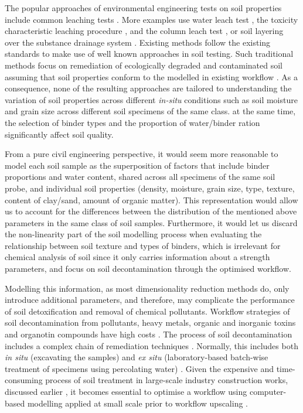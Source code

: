 \documentclass[algorithms,article,submit,pdftex,moreauthors]{Definitions/mdpi}
\begin{document}
The popular approaches of environmental engineering tests on soil properties include common leaching tests \cite{Chittoori,Beauchesne,Lemenkova202233}. More examples use water leach test \cite{Becker}, the toxicity characteristic leaching procedure \cite{Fuessle}, and the column leach test \cite{Dayioglu}, or soil layering over the substance drainage system \cite{Yu}. Existing methods follow the existing standards to make use of well known approaches in soil testing. Such traditional methods focus on remediation of ecologically degraded and contaminated soil assuming that soil properties conform to the modelled in existing workflow \cite{Alpaslan,ma16093444,su15064950}. As a consequence, none of the resulting approaches are tailored to understanding the variation of soil properties across different \emph{in-situ} conditions such as soil moisture and grain size across different soil specimens of the same class. at the same time, the selection of binder types and the proportion of water/binder ration significantly affect soil quality. 

From a pure civil engineering perspective, it would seem more reasonable to model each soil sample as the superposition of factors that include binder proportions and water content, shared across all specimens of the same soil probe, and individual soil properties (density, moisture, grain size, type, texture, content of clay/sand, amount of organic matter). This representation would allow us to account for the differences between the distribution of the mentioned above parameters in the same class of soil samples. Furthermore, it would let us discard the non-linearity part of the soil modelling process when evaluating the relationship between soil texture and types of binders, which is irrelevant for chemical analysis of soil since it only carries information about a strength parameters, and focus on soil decontamination through the optimised workflow. 

Modelling this information, as most dimensionality reduction methods do, only introduce additional parameters, and therefore, may complicate the performance of soil detoxification and removal of chemical pollutants. Workflow strategies of soil decontamination from pollutants, heavy metals, organic and inorganic toxins and organotin compounds have high costs \cite{Ghavami,Mishra,Lu}. The process of soil decontamination includes a complex chain of remediation techniques \cite{DU2014141}. Normally, this includes both \emph{in situ} (excavating the samples) and \emph{ex situ} (laboratory-based batch-wise treatment of specimens using percolating water) \cite{LU2023130021,CHEN2010638,KAVAMURA201061}. Given the expensive and time-consuming process of soil treatment in large-scale industry construction works, discussed earlier \cite{ChenLi,recycling1030328,Ahmed}, it becomes essential to optimise a workflow using computer-based modelling applied at small scale prior to workflow upscaling \cite{7733108}.  
\end{document}
